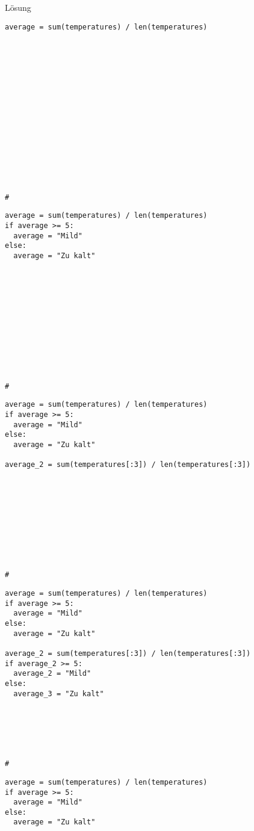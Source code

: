\begin{fragile}{}
\begin{block}{Lösung }
\vspace{2pt}
\begin{overprint}
\begin{verbatim}
average = sum(temperatures) / len(temperatures)
   
   














#   
\end{verbatim}
\begin{verbatim}
average = sum(temperatures) / len(temperatures)
if average >= 5: 
  average = "Mild"
else: 
  average = "Zu kalt"
  
  
  
  
  
  
  
  
  
  
  
  
#  
\end{verbatim}
\begin{verbatim}
average = sum(temperatures) / len(temperatures)
if average >= 5: 
  average = "Mild"
else: 
  average = "Zu kalt"

average_2 = sum(temperatures[:3]) / len(temperatures[:3])










#
\end{verbatim}
\begin{verbatim}
average = sum(temperatures) / len(temperatures)
if average >= 5: 
  average = "Mild"
else: 
  average = "Zu kalt"

average_2 = sum(temperatures[:3]) / len(temperatures[:3])
if average_2 >= 5:
  average_2 = "Mild"
else: 
  average_3 = "Zu kalt"






#
\end{verbatim}
\begin{verbatim}
average = sum(temperatures) / len(temperatures)
if average >= 5: 
  average = "Mild"
else: 
  average = "Zu kalt"


\end{verbatim}
\end{overprint}
\end{block}
\end{fragile}
